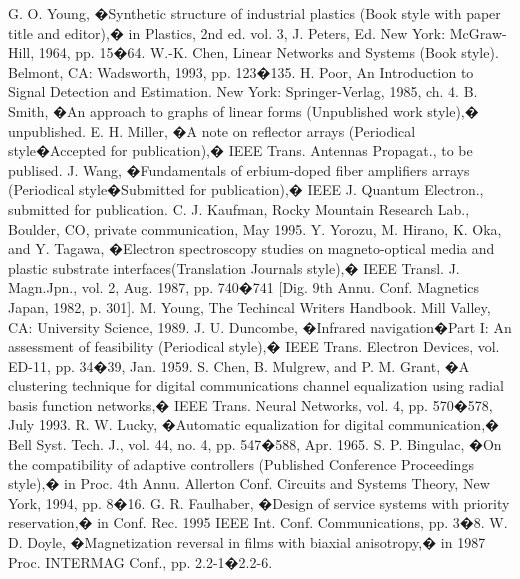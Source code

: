 \documentclass[letterpaper, 10 pt, conference]{IEEEconf}  %
\begin{document}
        \begin{thebibliography}{99}
        
         G. O. Young, �Synthetic structure of industrial plastics (Book style with paper title and editor),� 	in Plastics, 2nd ed. vol. 3, J. Peters, Ed.  New York: McGraw-Hill, 1964, pp. 15�64.
         W.-K. Chen, Linear Networks and Systems (Book style).	Belmont, CA: Wadsworth, 1993, pp. 123�135.
         H. Poor, An Introduction to Signal Detection and Estimation.   New York: Springer-Verlag, 1985, ch. 4.
         B. Smith, �An approach to graphs of linear forms (Unpublished work style),� unpublished.
         E. H. Miller, �A note on reflector arrays (Periodical style�Accepted for publication),� IEEE Trans. Antennas Propagat., to be publised.
         J. Wang, �Fundamentals of erbium-doped fiber amplifiers arrays (Periodical style�Submitted for publication),� IEEE J. Quantum Electron., submitted for publication.
         C. J. Kaufman, Rocky Mountain Research Lab., Boulder, CO, private communication, May 1995.
         Y. Yorozu, M. Hirano, K. Oka, and Y. Tagawa, �Electron spectroscopy studies on magneto-optical media and plastic substrate interfaces(Translation Journals style),� IEEE Transl. J. Magn.Jpn., vol. 2, Aug. 1987, pp. 740�741 [Dig. 9th Annu. Conf. Magnetics Japan, 1982, p. 301].
         M. Young, The Techincal Writers Handbook.  Mill Valley, CA: University Science, 1989.
         J. U. Duncombe, �Infrared navigation�Part I: An assessment of feasibility (Periodical style),� IEEE Trans. Electron Devices, vol. ED-11, pp. 34�39, Jan. 1959.
         S. Chen, B. Mulgrew, and P. M. Grant, �A clustering technique for digital communications channel equalization using radial basis function networks,� IEEE Trans. Neural Networks, vol. 4, pp. 570�578, July 1993.
         R. W. Lucky, �Automatic equalization for digital communication,� Bell Syst. Tech. J., vol. 44, no. 4, pp. 547�588, Apr. 1965.
         S. P. Bingulac, �On the compatibility of adaptive controllers (Published Conference Proceedings style),� in Proc. 4th Annu. Allerton Conf. Circuits and Systems Theory, New York, 1994, pp. 8�16.
         G. R. Faulhaber, �Design of service systems with priority reservation,� in Conf. Rec. 1995 IEEE Int. Conf. Communications, pp. 3�8.
         W. D. Doyle, �Magnetization reversal in films with biaxial anisotropy,� in 1987 Proc. INTERMAG Conf., pp. 2.2-1�2.2-6.

\end{thebibliography}
\end{document}
